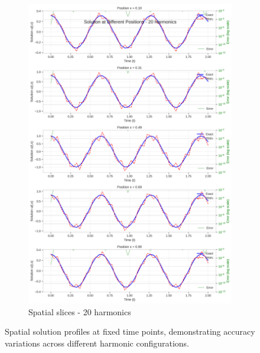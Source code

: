 \begin{figure}[H]
\begin{subfigure}[b]{0.48\textwidth}
        \includegraphics[width=\textwidth]{figures/space_slices_20h.png}
        \caption{Spatial slices - 20 harmonics}
    \end{subfigure}
    \caption{Spatial solution profiles at fixed time points, demonstrating accuracy variations across different harmonic configurations.}
    \label{fig:space_slice_comparison}
\end{figure}

